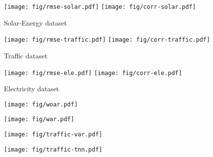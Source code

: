 \documentclass[sigconf]{acmart}
\def\electricity{{\sf Electricity}\xspace}
\def\traffic{{\sf Traffic}\xspace}
\def\solar{{\sf Solar-Energy}\xspace}
\def\exchange{{\sf Exchange-Rate}\xspace}
\begin{document}
\begin{figure*}[!ht]

\begin{subfigure}{\textwidth}
  \centering
  \texttt{[image: fig/rmse-solar.pdf]}
  \texttt{[image: fig/corr-solar.pdf]}
\caption{\solar dataset}
\end{subfigure}
\begin{subfigure}{\textwidth}
  \centering
  \texttt{[image: fig/rmse-traffic.pdf]}
  \texttt{[image: fig/corr-traffic.pdf]}
\caption{\traffic dataset}
\end{subfigure}

\begin{subfigure}{\textwidth}
  \centering
  \texttt{[image: fig/rmse-ele.pdf]}
  \texttt{[image: fig/corr-ele.pdf]}
\caption{\electricity dataset}
\end{subfigure}
\iffalse
\begin{subfigure}{\textwidth}
\centering
\texttt{[image: fig/rmse-exchange.pdf]}
\texttt{[image: fig/corr-ex.png]}
\caption{\exchange dataset}
\end{subfigure}
\fi
\caption{Results of LSTNet in the ablation tests on the \solar, \traffic and \electricity dataset}
\label{fig:ablation}
\end{figure*}

\begin{figure*}[!t]
\begin{subfigure}{.45\textwidth}
  \centering
  \texttt{[image: fig/woar.pdf]}
\caption{}
\end{subfigure}
\begin{subfigure}{.45\textwidth}
  \centering
  \texttt{[image: fig/war.pdf]}
\caption{}
\end{subfigure}
\caption{The predicted time series (red) by LSTw/oAR (a) and by LST-Skip  (b) vs. the true data (blue) on \electricity dataset with }
\label{fig:electricity}
\end{figure*}


\begin{figure*}[!ht]
\begin{subfigure}{.45\textwidth}
  \centering
  \texttt{[image: fig/traffic-var.pdf]}
  \caption{}
  \label{fig:tra-var}
\end{subfigure}
\begin{subfigure}{.45\textwidth}
  \centering
  \texttt{[image: fig/traffic-tnn.pdf]}
  \caption{}
  \label{fig:tra-tnn}
\end{subfigure}

\caption{The true time series (blue) and the predicted ones (red) by VAR (a) and by LSTNet (b) for one variable in the \traffic occupation dataset. The X axis indicates the week days and the forecasting .  VAR inadequately predicts similar patterns for Fridays and Saturdays, and ones for Sundays and Mondays, while LSTNet successfully captures both the daily and weekly repeating patterns.}
\label{fig:traffic}
\end{figure*}
\end{document}
